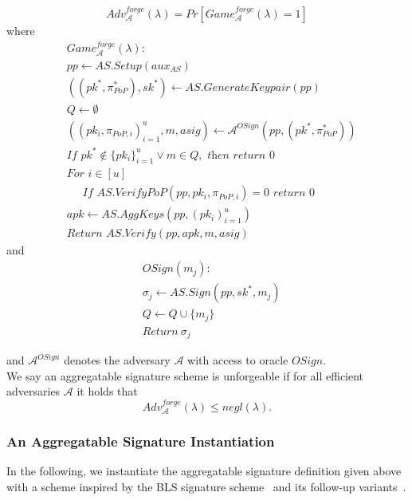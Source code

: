 \begin{definition}
$$\mathit{Adv}^{\mathit{forge}}_{\mathcal{A}}({\lambda}) = \mathit{Pr}[\mathit{Game}^{\mathit{forge}}_{\mathcal{A}}({\lambda}) =1]$$
\noindent where
\begin{align*}
&\mathit{Game}^{\mathit{forge}}_{\mathcal{A}}({\lambda}): \\
& \mathit{pp} \leftarrow \mathit{AS.Setup}(\mathit{aux_{\mathit{AS}}}) \\
& ((\mathit{pk}^*,\pi^*_{\mathit{PoP}}), \mathit{sk}^*) \leftarrow \mathit{AS.GenerateKeypair}(\mathit{pp})\\
& Q \leftarrow \emptyset \\
& ((\mathit{pk_i}, \pi_{\mathit{PoP},i})_{i=1}^{u}, m, \mathit{asig}) \leftarrow \mathcal{A}^{\mathit{OSign}}(\mathit{pp}, (\mathit{pk^*},\pi^*_{\mathit{PoP}})) \\
& \textit{If } \mathit{pk}^* \notin \{\mathit{pk_i}\}_{i=1}^{u} \vee m \in Q, \textit{ then return } 0 \\
& \textit{For } i \in [u] \\
& \ \ \ \ \ \textit{ If } \mathit{AS.VerifyPoP}(\mathit{pp}, \mathit{pk_i}, \pi_{\mathit{PoP},i})=0  \textit{ return } 0 \\
& \mathit{apk} \leftarrow \mathit{AS.AggKeys}(\mathit{pp}, (\mathit{pk_i})_{i=1}^{u}) \\
& \textit{Return } \mathit{AS.Verify}(\mathit{pp}, \mathit{apk}, m, \mathit{asig})
\end{align*}
\noindent and
\begin{align*}
& \mathit{OSign}(m_j): \\
& \sigma_j \leftarrow \mathit{AS.Sign}(\mathit{pp}, \mathit{sk}^*, m_j) \\
&  Q \leftarrow Q \cup \{m_j\} \\
& \textit{Return} \ \sigma_j
\end{align*}

\noindent and $\mathcal{A}^{\mathit{OSign}}$ denotes the adversary $\mathcal{A}$ with access to oracle $\mathit{OSign}$. \\

\noindent We say an aggregatable signature scheme is unforgeable if for all efficient adversaries
$\mathcal{A}$ it holds that $$\mathit{Adv}^{\mathit{forge}}_{\mathcal{A}}({\lambda}) \leq \mathit{negl}(\lambda).$$ 
\end{definition}

\subsubsection{An Aggregatable Signature Instantiation}
\label{sec:bls}
\noindent In the following, we instantiate the aggregatable signature definition given above with a scheme inspired by the BLS signature
scheme~\cite{BLS_signatures} and its follow-up variants~\cite{proofs_of_posession,boneh_compact_multisig}.

